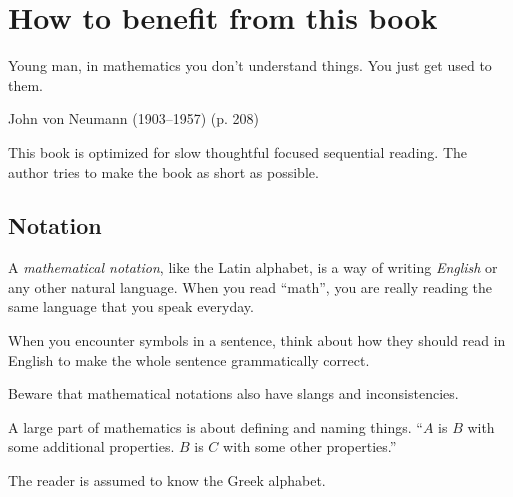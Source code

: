 \chapter{How to benefit from this book}

\epigraph{Young man, in mathematics you don't understand things. You just get used to them.}{John von Neumann (1903--1957) \cite{zukav1979dancing} (p. 208)}

This book is optimized for slow thoughtful focused sequential reading.
The author tries to make the book as short as possible.

\section{Notation}

A \emph{mathematical notation}, like the Latin alphabet,
is a way of writing \emph{English} or any other natural language.
When you read ``math'',
you are really reading the same language
that you speak everyday.

When you encounter symbols in a sentence,
think about how they should read in English
to make the whole sentence grammatically correct.

Beware that mathematical notations also have slangs and inconsistencies.

A large part of mathematics is about defining and naming things.
``\(A\) is \(B\) with some additional properties. \(B\) is \(C\) with some other properties.''

The reader is assumed to know the Greek alphabet.

